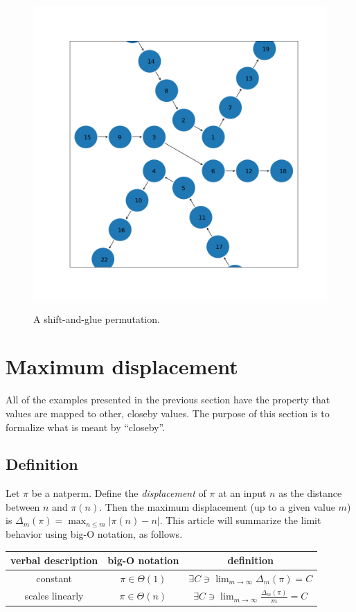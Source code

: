 \documentclass[12pt,reqno]{article}
\begin{document}
\begin{figure}
  \includegraphics[width=\linewidth]{figs/fig1.png}
  \label{fig:shiftandglue}
  \caption{A shift-and-glue permutation.}
  \label{fig:shiftandglue}
\end{figure}

\section{Maximum displacement}

All of the examples presented in the previous section have the property that values are mapped to other, closeby values. The purpose of this section is to formalize what is meant by ``closeby''.

\subsection{Definition}

Let $\pi$ be a natperm. Define the \textit{displacement} of $\pi$ at an input $n$ as the distance between $n$ and $\pi(n)$. Then the maximum displacement (up to a given value $m$) is $\Delta_m(\pi) = \max_{n \leq m} | \pi(n) - n |$. This article will summarize the limit behavior using big-O notation, as follows.

\begingroup
\renewcommand{\arraystretch}{1.5} %
\begin{center} \begin{tabular}{ |c|c|c| } 
  \hline
    verbal description & big-O notation       & definition \\
  \hline
    constant                & $\pi \in \Theta(1)$ & $\exists C \ni \lim_{m \rightarrow \infty} \Delta_m(\pi) = C$ \\
    scales linearly       & $\pi \in \Theta(n)$ & $\exists C \ni \lim_{m \rightarrow \infty} \frac{\Delta_m(\pi)}{m} = C$ \\
  \hline
\end{tabular} \end{center}
\endgroup
\end{document}
